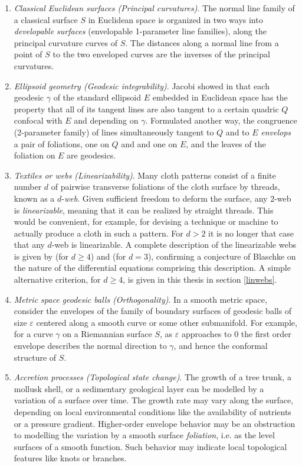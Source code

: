 \documentclass[12pt]{article}
\numberwithin{equation}{section}
\theoremstyle{plain}
\theoremstyle{definition}
\begin{document}
\begin{enumerate}
\itemsep0em
\item{\emph{Classical Euclidean surfaces (Principal curvatures)}. The normal line family of a classical surface $S$ in Euclidean space is organized in two ways into \emph{developable surfaces} (envelopable 1-parameter line families), along the principal curvature curves of $S$. The distances along a normal line from a point of $S$ to the two enveloped curves are the inverses of the principal curvatures.}
\item{\emph{Ellipsoid geometry (Geodesic integrability)}. Jacobi showed in \cite{jacobi} that each geodesic $\gamma$ of the standard ellipsoid $E$ embedded in Euclidean space has the property that all of its tangent lines are also tangent to a certain quadric $Q$ confocal with $E$ and depending on $\gamma$. Formulated another way, the congruence (2-parameter family) of lines simultaneously tangent to $Q$ and to $E$ \emph{envelops} a pair of foliations, one on $Q$ and and one on $E$, and the leaves of the foliation on $E$ are geodesics.}
\item{\emph{Textiles or webs (Linearizability)}. Many cloth patterns consist of a finite number $d$ of pairwise transverse foliations of the cloth surface by threads, known as a $d$-\emph{web}. Given sufficient freedom to deform the surface, any $2$-web is \emph{linearizable}, meaning that it can be realized by straight threads. This would be convenient, for example, for devising a technique or machine to actually produce a cloth in such a pattern. For $d>2$ it is no longer that case that any $d$-web is linearizable. A complete description of the linearizable webs is given by \cite{lychagin4webs} (for $d\geq 4$) and \cite{lychagin2} (for $d=3$), confirming a conjecture of Blaschke on the nature of the differential equations comprising this description. A simple alternative criterion, for $d\geq 4$, is given in this thesis in section \ref{linwebs}.}
\item{\emph{Metric space geodesic balls (Orthogonality)}. In a smooth metric space, consider the envelopes of the family of boundary surfaces of geodesic balls of size $\varepsilon$ centered along a smooth curve or some other submanifold. For example, for a curve $\gamma$ on a Riemannian surface $S$, as $\varepsilon$ approaches to $0$ the first order envelope describes the normal direction to $\gamma$, and hence the conformal structure of $S$.}
\item{\emph{Accretion processes (Topological state change)}.\label{accretion} The growth of a tree trunk, a mollusk shell, or a sedimentary geological layer can be modelled by a variation of a surface over time. The growth rate may vary along the surface, depending on local environmental conditions like the availability of nutrients or a pressure gradient. Higher-order envelope behavior may be an obstruction to modelling the variation by a smooth surface \emph{foliation}, i.e. as the level surfaces of a smooth function. Such behavior may indicate local topological features like knots or branches.}

\end{enumerate}
\end{document}
